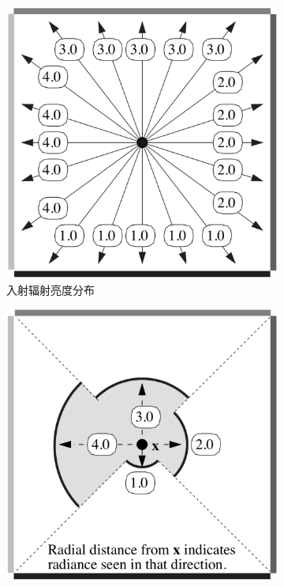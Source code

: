 \begin{figure}
\begin{fullwidth}
	\begin{subfigure}[b]{0.33\thewidth}
		\includegraphics[width=\textwidth]{figures/pl/light-field-1}
		\caption{入射辐射亮度分布}
	\end{subfigure}
	\begin{subfigure}[b]{0.33\thewidth}
		\includegraphics[width=\textwidth]{figures/pl/light-field-2}

\end{subfigure}
\end{fullwidth}
\end{figure}
